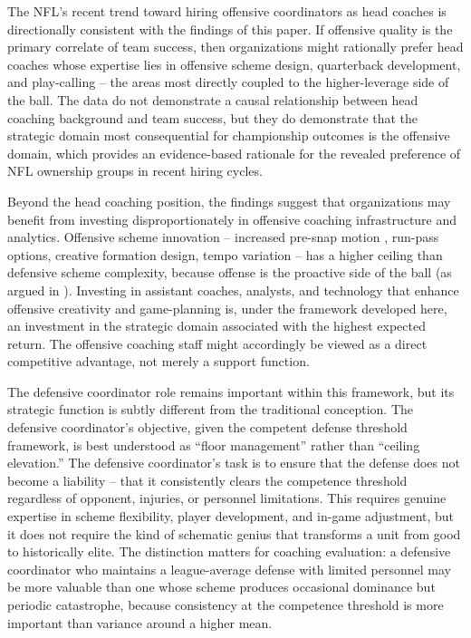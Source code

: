 The NFL's recent trend toward hiring offensive coordinators as head coaches \parencite{breer2024coaching_hires} is
directionally consistent with the findings of this paper. If offensive quality
is the primary correlate of team success, then organizations might rationally
prefer head coaches whose expertise lies in offensive scheme design, quarterback
development, and play-calling -- the areas most directly coupled to the
higher-leverage side of the ball. The data do not demonstrate a causal
relationship between head coaching background and team success, but they do
demonstrate that the strategic domain most consequential for championship
outcomes is the offensive domain, which provides an evidence-based rationale
for the revealed preference of NFL ownership groups in recent hiring cycles.

Beyond the head coaching position, the findings suggest that organizations
may benefit from investing disproportionately in offensive coaching
infrastructure and analytics. Offensive scheme innovation -- increased pre-snap motion \parencite{pff2023presnap_motion}, run-pass
options, creative formation design, tempo variation -- has a higher ceiling
than defensive scheme complexity, because offense is the proactive side of
the ball (as argued in ). Investing in
assistant coaches, analysts, and technology that enhance offensive creativity
and game-planning is, under the framework developed here, an investment in
the strategic domain associated with the highest expected return. The
offensive coaching staff might accordingly be viewed as a direct competitive
advantage, not merely a support function.

The defensive coordinator role remains important within this framework, but
its strategic function is subtly different from the traditional conception. The
defensive coordinator's objective, given the competent defense threshold
framework, is best understood as ``floor management'' rather than
``ceiling elevation.'' The defensive coordinator's task is to ensure that the
defense does not become a liability -- that it consistently clears the
competence threshold regardless of opponent, injuries, or personnel
limitations. This requires genuine expertise in scheme flexibility, player
development, and in-game adjustment, but it does not require the kind of
schematic genius that transforms a unit from good to historically elite. The
distinction matters for coaching evaluation: a defensive coordinator who
maintains a league-average defense with limited personnel may be more valuable
than one whose scheme produces occasional dominance but periodic catastrophe,
because consistency at the competence threshold is more important than variance
around a higher mean.

